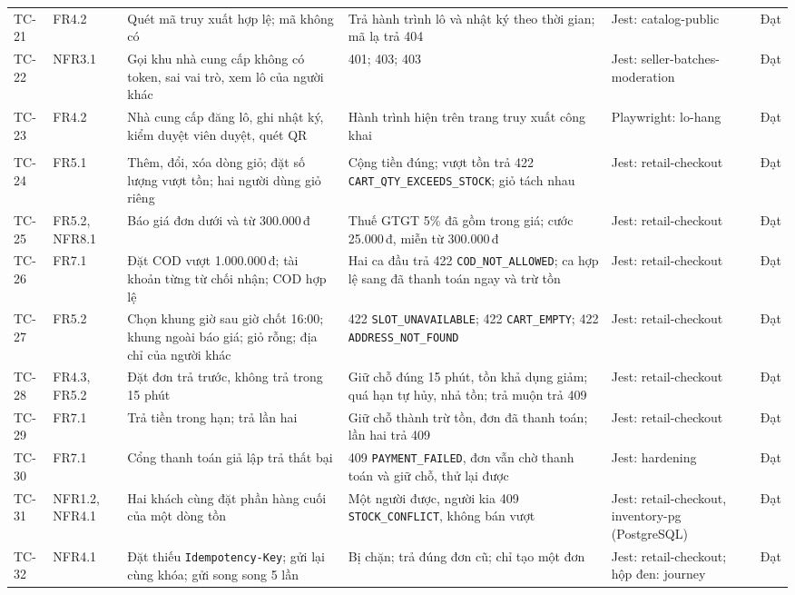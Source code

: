 \begin{longtable}{L{1.40cm} L{1.55cm} L{4.00cm} L{4.05cm} L{1.95cm} L{1.95cm}}
TC-21 & FR4.2 & Quét mã truy xuất hợp lệ; mã không có & Trả hành trình lô và nhật ký theo thời gian; mã lạ trả 404 & Jest: catalog-public & Đạt \\
TC-22 & NFR3.1 & Gọi khu nhà cung cấp không có token, sai vai trò, xem lô của người khác & 401; 403; 403 & Jest: seller-batches-moderation & Đạt \\
TC-23 & FR4.2 & Nhà cung cấp đăng lô, ghi nhật ký, kiểm duyệt viên duyệt, quét QR & Hành trình hiện trên trang truy xuất công khai & Playwright: lo-hang & Đạt \\
 \\
TC-24 & FR5.1 & Thêm, đổi, xóa dòng giỏ; đặt số lượng vượt tồn; hai người dùng giỏ riêng & Cộng tiền đúng; vượt tồn trả 422 \texttt{CART\_QTY\_EXCEEDS\_STOCK}; giỏ tách nhau & Jest: retail-checkout & Đạt \\
TC-25 & FR5.2, NFR8.1 & Báo giá đơn dưới và từ 300.000\,đ & Thuế GTGT 5\% đã gồm trong giá; cước 25.000\,đ, miễn từ 300.000\,đ & Jest: retail-checkout & Đạt \\
TC-26 & FR7.1 & Đặt COD vượt 1.000.000\,đ; tài khoản từng từ chối nhận; COD hợp lệ & Hai ca đầu trả 422 \texttt{COD\_NOT\_ALLOWED}; ca hợp lệ sang đã thanh toán ngay và trừ tồn & Jest: retail-checkout & Đạt \\
TC-27 & FR5.2 & Chọn khung giờ sau giờ chốt 16:00; khung ngoài báo giá; giỏ rỗng; địa chỉ của người khác & 422 \texttt{SLOT\_UNAVAILABLE}; 422 \texttt{CART\_EMPTY}; 422 \texttt{ADDRESS\_NOT\_FOUND} & Jest: retail-checkout & Đạt \\
TC-28 & FR4.3, FR5.2 & Đặt đơn trả trước, không trả trong 15 phút & Giữ chỗ đúng 15 phút, tồn khả dụng giảm; quá hạn tự hủy, nhả tồn; trả muộn trả 409 & Jest: retail-checkout & Đạt \\
TC-29 & FR7.1 & Trả tiền trong hạn; trả lần hai & Giữ chỗ thành trừ tồn, đơn đã thanh toán; lần hai trả 409 & Jest: retail-checkout & Đạt \\
TC-30 & FR7.1 & Cổng thanh toán giả lập trả thất bại & 409 \texttt{PAYMENT\_FAILED}, đơn vẫn chờ thanh toán và giữ chỗ, thử lại được & Jest: hardening & Đạt \\
TC-31 & NFR1.2, NFR4.1 & Hai khách cùng đặt phần hàng cuối của một dòng tồn & Một người được, người kia 409 \texttt{STOCK\_CONFLICT}, không bán vượt & Jest: retail-checkout, inventory-pg (PostgreSQL) & Đạt \\
TC-32 & NFR4.1 & Đặt thiếu \texttt{Idempotency-Key}; gửi lại cùng khóa; gửi song song 5 lần & Bị chặn; trả đúng đơn cũ; chỉ tạo một đơn & Jest: retail-checkout; hộp đen: journey & Đạt \\

\end{longtable}
